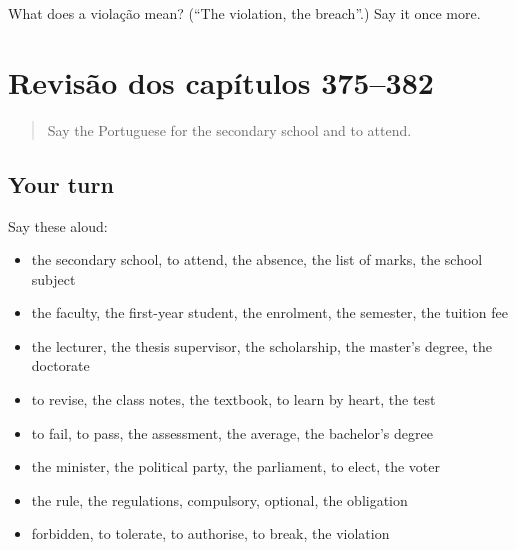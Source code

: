 \begin{tcolorbox}[breakable,colback=teal!4,colframe=teal!35!black,title={Before you move on}]
What does a violação mean? (\textquotedblleft{}The violation, the breach\textquotedblright{}.) Say it once more.
\end{tcolorbox}
\section[(dialogue)]{Revisão dos capítulos 375–382}

\label{lesson:PT-R382-revisao-375-382}



\begin{quote}
Say the Portuguese for the secondary school and to attend.
\end{quote}

\subsection*{Your turn}
Say these aloud:

\begin{itemize}
\raggedright
  \item the secondary school, to attend, the absence, the list of marks, the school subject
  \item the faculty, the first-year student, the enrolment, the semester, the tuition fee
  \item the lecturer, the thesis supervisor, the scholarship, the master's degree, the doctorate
  \item to revise, the class notes, the textbook, to learn by heart, the test
  \item to fail, to pass, the assessment, the average, the bachelor's degree
  \item the minister, the political party, the parliament, to elect, the voter
  \item the rule, the regulations, compulsory, optional, the obligation
  \item forbidden, to tolerate, to authorise, to break, the violation
\end{itemize}

